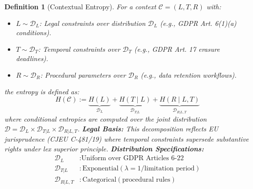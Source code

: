 \documentclass[preprint,12pt]{elsarticle}
\newtheorem{definition}{Definition}[section]
\begin{document}
            \begin{definition}[Contextual Entropy]\label{def:context_entropy}
                For a context $\mathcal{C} = (L, T, R)$ with:
                \begin{itemize}
                    \item $L \sim \mathcal{D}_L$: Legal constraints over distribution $\mathcal{D}_L$ (e.g., GDPR Art. 6(1)(a) conditions).
                    \item $T \sim \mathcal{D}_T$: Temporal constraints over $\mathcal{D}_T$ (e.g., GDPR Art. 17 erasure deadlines).
                    \item $R \sim \mathcal{D}_R$: Procedural parameters over $\mathcal{D}_R$ (e.g., data retention workflows).
                \end{itemize}
                the entropy is defined as:
                \begin{equation}\label{eq:context_entropy}
                    H(\mathcal{C}) := \underbrace{H(L)}_{\mathcal{D}_L} + \underbrace{H(T \mid L)}_{\mathcal{D}_{T|L}} + \underbrace{H(R \mid L, T)}_{\mathcal{D}_{R|L,T}}
                \end{equation}
                where conditional entropies are computed over the joint distribution $\mathcal{D} = \mathcal{D}_L \times \mathcal{D}_{T|L} \times \mathcal{D}_{R|L,T}$.
                \textbf{Legal Basis:} This decomposition reflects EU jurisprudence (CJEU C-481/19) where temporal constraints supersede substantive rights under lex superior principle.
                \textbf{Distribution Specifications:} 
                    \begin{align*}
                        \mathcal{D}_L &: \text{Uniform over GDPR Articles 6-22} \\
                        \mathcal{D}_{T|L} &: \text{Exponential}(\lambda = 1/\text{limitation period}) \\
                        \mathcal{D}_{R|L,T} &: \text{Categorical}(\text{procedural rules})
                    \end{align*}
                \end{definition}
\end{document}
